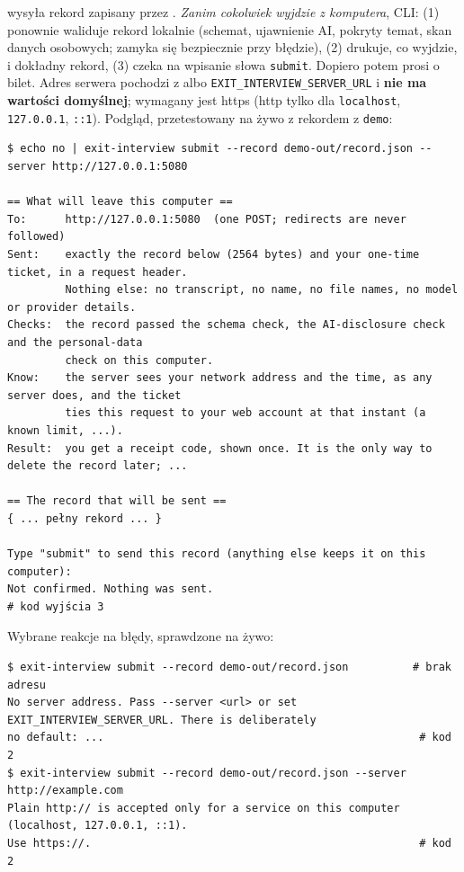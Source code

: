 {
wysyła rekord zapisany przez . \emph{Zanim cokolwiek
wyjdzie z komputera}, CLI: (1) ponownie waliduje rekord lokalnie (schemat,
ujawnienie AI, pokryty temat, skan danych osobowych; zamyka się
bezpiecznie przy błędzie), (2) drukuje, co wyjdzie, i dokładny rekord, (3)
czeka na wpisanie słowa \texttt{submit}. Dopiero potem prosi o bilet. Adres
serwera pochodzi z  albo \texttt{EXIT\_\allowbreak{}INTERVIEW\_\allowbreak{}SERVER\_\allowbreak{}URL}
i \textbf{nie ma wartości domyślnej}; wymagany jest https (http tylko dla
\texttt{localhost}, \texttt{127.0.0.1}, \texttt{::1}). Podgląd, przetestowany na
żywo z rekordem z \texttt{demo}:

\begin{Verbatim}[fontsize=\scriptsize,frame=single,framesep=2mm]
$ echo no | exit-interview submit --record demo-out/record.json --server http://127.0.0.1:5080

== What will leave this computer ==
To:      http://127.0.0.1:5080  (one POST; redirects are never followed)
Sent:    exactly the record below (2564 bytes) and your one-time ticket, in a request header.
         Nothing else: no transcript, no name, no file names, no model or provider details.
Checks:  the record passed the schema check, the AI-disclosure check and the personal-data
         check on this computer.
Know:    the server sees your network address and the time, as any server does, and the ticket
         ties this request to your web account at that instant (a known limit, ...).
Result:  you get a receipt code, shown once. It is the only way to delete the record later; ...

== The record that will be sent ==
{ ... pełny rekord ... }

Type "submit" to send this record (anything else keeps it on this computer):
Not confirmed. Nothing was sent.                                      # kod wyjścia 3
\end{Verbatim}

Wybrane reakcje na błędy, sprawdzone na żywo:

\begin{Verbatim}[fontsize=\scriptsize,frame=single,framesep=2mm]
$ exit-interview submit --record demo-out/record.json          # brak adresu
No server address. Pass --server <url> or set EXIT_INTERVIEW_SERVER_URL. There is deliberately
no default: ...                                                 # kod 2
$ exit-interview submit --record demo-out/record.json --server http://example.com
Plain http:// is accepted only for a service on this computer (localhost, 127.0.0.1, ::1).
Use https://.                                                   # kod 2
\end{Verbatim}

}
